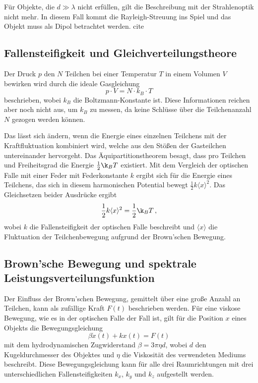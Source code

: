     Für Objekte, die $d\gg\lambda$ nicht erfüllen, gilt die Beschreibung mit der Strahlenoptik nicht mehr. In diesem Fall kommt die Rayleigh-Streuung ins Spiel und das Objekt muss als Dipol betrachtet werden. cite
  \subsection{Fallensteifigkeit und Gleichverteilungstheore}
    Der Druck $p$ den $N$ Teilchen bei einer Temperatur $T$ in einem Volumen $V$ bewirken wird durch die ideale Gasgleichung
    \begin{equation}
      p\cdot V = N\cdot k_B\cdot T
    \end{equation}
    beschrieben, wobei $k_B$ die Boltzmann-Konstante ist. Diese Informationen reichen aber noch nicht aus, um $k_B$ zu messen, da keine Schlüsse über die Teilchenanzahl $N$ gezogen werden können.

    Das lässt sich ändern, wenn die Energie eines einzelnen Teilchens mit der Kraftfluktuation kombiniert wird, welche aus den Stößen der Gasteilchen untereinander hervorgeht. Das Äquipartitionstheorem besagt, dass pro Teilchen und Freiheitsgrad die Energie $\frac{1}{2}\k_BT$ existiert. Mit dem Vergleich der optischen Falle mit einer Feder mit Federkonstante $k$ ergibt sich für die Energie eines Teilchens, das sich in diesem harmonischen Potential bewegt $\frac{1}{2}k\langle x\rangle^2$. Das Gleichsetzen beider Ausdrücke ergibt
    \begin{equation}
      \frac{1}{2}k\langle x\rangle^2 = \frac{1}{2}\k_BT \, ,
    \end{equation}
    wobei $k$ die Fallensteifigkeit der optischen Falle beschreibt und $\langle x\rangle$  die Fluktuation der Teilchenbewegung aufgrund der Brown'schen Bewegung.
  \subsection{Brown'sche Bewegung und spektrale Leistungsverteilungsfunktion}
    Der Einfluss der Brown'schen Bewegung, gemittelt über eine große Anzahl an Teilchen, kann als zufällige Kraft $F(t)$ beschrieben werden. Für eine viskose Bewegung, wie es in der optischen Falle der Fall ist, gilt für die Position $x$ eines Objekts die Bewegungsgleichung
    \begin{equation}
      \beta \dot{x}(t) + kx(t) = F(t)
    \end{equation}
    mit dem hydrodynamischen Zugwiderstand $\beta = 3\pi\eta d$, wobei $d$ den Kugeldurchmesser des Objektes und $\eta$ die Viskosität des verwendeten Mediums beschreibt. Diese Bewegungsgleichung kann für alle drei Raumrichtungen mit drei unterschiedlichen Fallensteifigkeiten $k_x$, $k_y$ und $k_z$ aufgestellt werden.

